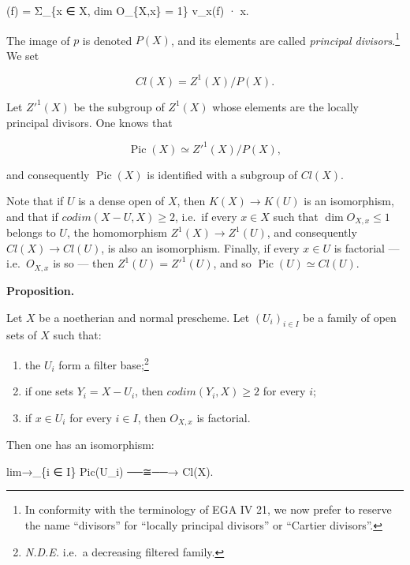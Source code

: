 \documentclass[
]{article}
\newenvironment{Shaded}{}{}
\newcommand{\NormalTok}[1]{#1}
\providecommand{\tightlist}{%
  \setlength{\itemsep}{0pt}\setlength{\parskip}{0pt}}
\begin{document}
\begin{Shaded}
\begin{Highlighting}[]
\NormalTok{(f) = Σ\_\{x ∈ X, dim O\_\{X,x\} = 1\} v\_x(f) · x.}
\end{Highlighting}
\end{Shaded}

The image of \(p\) is denoted \(P(X)\), and its elements are called
\emph{principal divisors}.\footnote{In conformity with the terminology
  of EGA IV 21, we now prefer to reserve the name ``divisors'' for
  ``locally principal divisors'' or ``Cartier divisors''.} We set

\[
Cl(X) = Z^{1}(X)/P(X).
\]

Let \(Z'^{1}(X)\) be the subgroup of \(Z^{1}(X)\) whose elements are the
locally principal divisors. One knows that

\[
\operatorname{Pic}(X) \simeq Z'^{1}(X)/P(X),
\]

and consequently \(\operatorname{Pic}(X)\) is identified with a subgroup
of \(Cl(X)\).

Note that if \(U\) is a dense open of \(X\), then \(K(X) \to K(U)\) is
an isomorphism, and that if \(codim(X - U, X) \geqslant 2\), i.e.~if
every \(x \in X\) such that \(\dim O_{X,x} \leqslant 1\) belongs to
\(U\), the homomorphism \(Z^{1}(X) \to Z^{1}(U)\), and consequently
\(Cl(X) \to Cl(U)\), is also an isomorphism. Finally, if every
\(x \in U\) is factorial --- i.e.~\(O_{X,x}\) is so --- then
\(Z^{1}(U) = Z'^{1}(U)\), and so \(\operatorname{Pic}(U) \simeq Cl(U)\).

\textbf{Proposition.}

Let \(X\) be a noetherian and normal prescheme. Let
\((U_{i})_{i \in I}\) be a family of open sets of \(X\) such that:

\begin{enumerate}
\def\labelenumi{\arabic{enumi}.}
\tightlist
\item
  the \(U_{i}\) form a filter base;\footnote{\emph{N.D.E.} i.e.~a
    decreasing filtered family.}
\item
  if one sets \(Y_{i} = X - U_{i}\), then
  \(codim(Y_{i}, X) \geqslant 2\) for every \(i\);
\item
  if \(x \in U_{i}\) for every \(i \in I\), then \(O_{X,x}\) is
  factorial.
\end{enumerate}

Then one has an isomorphism:

\begin{Shaded}
\begin{Highlighting}[]
\NormalTok{lim→\_\{i ∈ I\} Pic(U\_i) ──≅──→ Cl(X).}
\end{Highlighting}
\end{Shaded}
\end{document}
